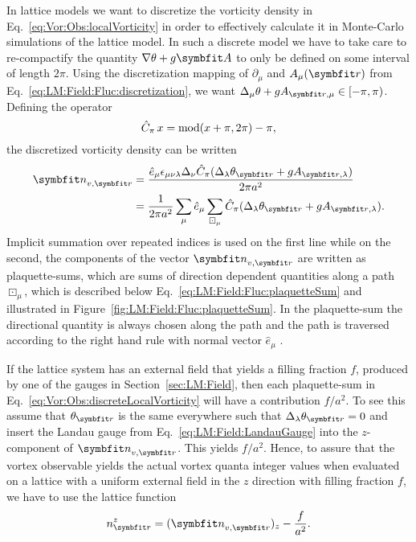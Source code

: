 In lattice models we want to discretize the vorticity density in Eq.~\eqref{eq:Vor:Obs:localVorticity} in order to effectively calculate it in Monte-Carlo simulations
of the lattice model. In such a discrete model we have to take care to re-compactify the quantity $\nabla\theta+g\v{A}$ to only be defined on some interval of length $2\pi$.
Using the discretization mapping of $\partial_\mu$ and $A_\mu(\v{r})$ from Eq.~\eqref{eq:LM:Field:Fluc:discretization}, we want
$\Delta_\mu\theta + gA_{\v{r},\mu}\in[-\pi,\pi)$. Defining the operator
\begin{equation}
    \label{eq:Vor:Obs:moduloOperator}
    \hat{C}_\pi\, x = \operatorname{mod}(x+\pi,2\pi)-\pi,
\end{equation}
the discretized vorticity density can be written
\begin{equation}
    \label{eq:Vor:Obs:discreteLocalVorticity}
    \begin{split}
        \v{n}_{v,\v{r}} &= \frac{\hat{e}_\mu\epsilon_{\mu\nu\lambda}\Delta_\nu\hat{C}_\pi(\Delta_\lambda\theta_\v{r} + gA_{\v{r},\lambda})}{2\pi a^2}\\
        &= \frac{1}{2\pi a^2}\sum_\mu \hat{e}_\mu\sum_{\boxdot_\mu}\hat{C}_\pi(\Delta_\lambda\theta_\v{r} + gA_{\v{r},\lambda}).
    \end{split}
\end{equation}
Implicit summation over repeated indices is used on the first line while on the second, the components of the vector $\v{n}_{v,\v{r}}$ are written as plaquette-sums,
which are sums of direction dependent quantities along a path $\boxdot_\mu$, which is described below Eq.~\eqref{eq:LM:Field:Fluc:plaquetteSum} and illustrated in
Figure~\ref{fig:LM:Field:Fluc:plaquetteSum}. In the plaquette-sum the directional quantity is always chosen along the path and the path is traversed according to
the right hand rule with normal vector $\hat{e}_\mu$ \cite{Kragset08,shimizu12}.

If the lattice system has an external field that yields a filling fraction $f$, \eg produced by one of the gauges in Section~\ref{sec:LM:Field}, then each plaquette-sum
in Eq.~\eqref{eq:Vor:Obs:discreteLocalVorticity} will have a contribution $f/a^2$. To see this assume \eg that $\theta_\v{r}$ is the same everywhere such that
$\Delta_\lambda\theta_\v{r}=0$ and insert the Landau gauge from Eq.~\eqref{eq:LM:Field:LandauGauge} into the $z$-component of $\v{n}_{v,\v{r}}$. This yields $f/a^2$.
Hence, to assure that the vortex observable yields the actual vortex quanta integer values when evaluated on a lattice with a uniform external field in the $z$
direction with filling fraction $f$, we have to use the lattice function
\begin{equation}
    \label{eq:Vor:Obs:discreteLocalVorticity:fieldSubtracted}
    n^z_\v{r} = (\v{n}_{v,\v{r}})_z - \frac{f}{a^2}.
\end{equation}

